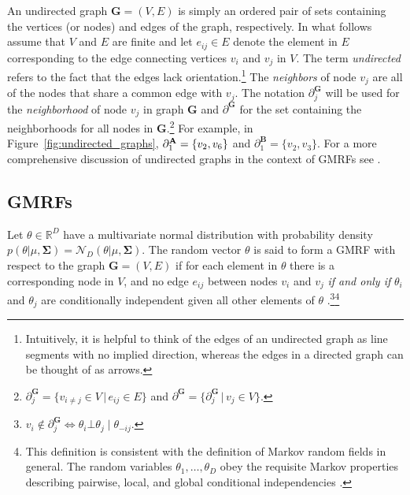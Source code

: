  An undirected graph $\mathbf{G} = (V,E)$ is simply an ordered pair of sets containing the vertices (or nodes) and edges of the graph, respectively. In what follows assume that $V$ and $E$ are finite and let $e_{ij} \in E$ denote the element in $E$ corresponding to the edge connecting vertices $v_i$ and $v_j$ in $V$. The term {\it undirected} refers to the fact that the edges lack orientation.\footnote{Intuitively, it is helpful to think of the edges of an undirected graph as line segments with no implied direction, whereas the edges in a directed graph can be thought of as arrows.} The {\it neighbors} of node $v_j$ are all of the nodes that share a common edge with $v_j$. The notation $\partial^{\mathbf{G}}_j$ will be used for the {\it neighborhood} of node $v_j$ in graph  $\mathbf{G}$ and $\partial^\mathbf{G}$ for the set containing the neighborhoods for all nodes in $\mathbf{G}$.\footnote{$ \partial^\mathbf{G}_j = \{v_{i \neq j} \in V \,\vert\, e_{ij} \in E\}$ and $\partial^\mathbf{G} = \{\partial^\mathbf{G}_j \,\vert\, v_j \in V\}$.} For example, in Figure~\ref{fig:undirected_graphs}, $\partial^{\mathbf{A}}_1 = \{v_2, v_6\}$ and $\partial^{\mathbf{B}}_1 = \{v_2, v_3\}$.  For a more comprehensive discussion of undirected graphs in the context of GMRFs see . 
 



\subsection{GMRFs}
Let $\theta \in \mathbb{R}^D$ have a multivariate normal distribution with probability density $p(\theta | \mu, \boldsymbol{\Sigma}) = \mathcal{N}_D (\theta | \mu, \boldsymbol{\Sigma})$. The random vector $\theta$ is said to form a GMRF with respect to the graph $\mathbf{G} = (V,E)$ if for each element in $\theta$ there is a corresponding node in $V$, and no edge $e_{ij}$ between nodes $v_i$ and $v_j$ \emph{if and only if} $\theta_i$ and $\theta_j$ are conditionally independent given all other elements of $\theta$ .\footnote{$v_i \notin \partial^\mathbf{G}_{j} \iff \theta_i \bot \theta_j \mid \theta_{-ij}.$}\footnote{This definition is consistent with the definition of Markov random fields in general. The random variables $\theta_1, \dots, \theta_D$ obey the requisite Markov properties describing pairwise, local, and global conditional independencies .} 

